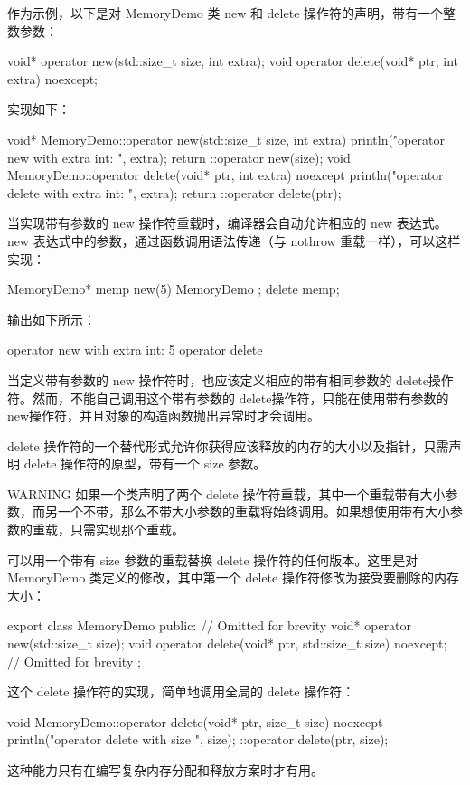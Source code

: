 作为示例，以下是对 MemoryDemo 类 new 和 delete 操作符的声明，带有一个整数参数：

\begin{cpp}
void* operator new(std::size_t size, int extra);
void operator delete(void* ptr, int extra) noexcept;
\end{cpp}

实现如下：

\begin{cpp}
void* MemoryDemo::operator new(std::size_t size, int extra)
{
    println("operator new with extra int: {}", extra);
    return ::operator new(size);
}
void MemoryDemo::operator delete(void* ptr, int extra) noexcept
{
    println("operator delete with extra int: {}", extra);
    return ::operator delete(ptr);
}
\end{cpp}

当实现带有参数的 new 操作符重载时，编译器会自动允许相应的 new 表达式。new 表达式中的参数，通过函数调用语法传递（与 nothrow 重载一样），可以这样实现：

\begin{cpp}
MemoryDemo* memp { new(5) MemoryDemo{} };
delete memp;
\end{cpp}

输出如下所示：

\begin{shell}
operator new with extra int: 5
operator delete
\end{shell}

当定义带有参数的 new 操作符时，也应该定义相应的带有相同参数的 delete操作符。然而，不能自己调用这个带有参数的 delete操作符，只能在使用带有参数的 new操作符，并且对象的构造函数抛出异常时才会调用。


delete 操作符的一个替代形式允许你获得应该释放的内存的大小以及指针，只需声明 delete 操作符的原型，带有一个 size 参数。

\begin{myWarning}{WARNING}
如果一个类声明了两个 delete 操作符重载，其中一个重载带有大小参数，而另一个不带，那么不带大小参数的重载将始终调用。如果想使用带有大小参数的重载，只需实现那个重载。
\end{myWarning}

可以用一个带有 size 参数的重载替换 delete 操作符的任何版本。这里是对 MemoryDemo 类定义的修改，其中第一个 delete 操作符修改为接受要删除的内存大小：

\begin{cpp}
export class MemoryDemo
{
    public:
        // Omitted for brevity
        void* operator new(std::size_t size);
        void operator delete(void* ptr, std::size_t size) noexcept;
        // Omitted for brevity
};
\end{cpp}

这个 delete 操作符的实现，简单地调用全局的 delete 操作符：

\begin{cpp}
void MemoryDemo::operator delete(void* ptr, size_t size) noexcept
{
    println("operator delete with size {}", size);
    ::operator delete(ptr, size);
}
\end{cpp}

这种能力只有在编写复杂内存分配和释放方案时才有用。




